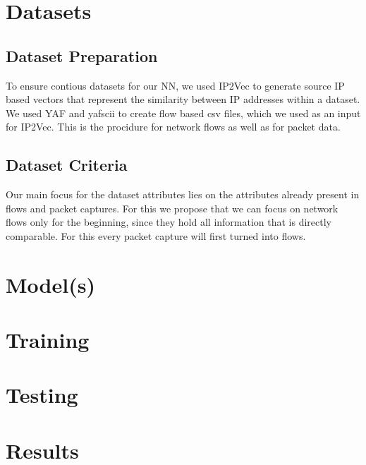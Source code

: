 \documentclass[
	ngerman,
	ruledheaders=section,%
	class=report,%
	thesis={type=bachelor},%
	accentcolor=9c,%
	custommargins=true,%
	marginpar=false,%
	parskip=half-,%
	fontsize=11pt,%
]{tudapub}
\begin{document}

\section{Datasets}

\subsection{Dataset Preparation}

To ensure contious datasets for our NN, we used IP2Vec to generate source IP based vectors that represent the similarity between IP addresses within a dataset.
We used YAF and yafscii to create flow based csv files, which we used as an input for IP2Vec.
This is the procidure for network flows as well as for packet data.

\subsection{Dataset Criteria}

Our main focus for the dataset attributes lies on the attributes already present in flows and packet captures.
For this we propose that we can focus on network flows only for the beginning, since they hold all information that is directly comparable.
For this every packet capture will first turned into flows.


\section{Model(s)}



\section{Training}

\section{Testing}

\section{Results}
\end{document}
